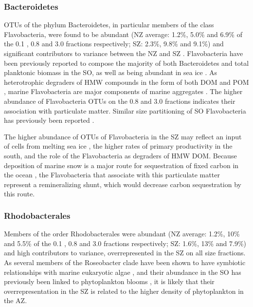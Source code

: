 \subsubsection{Bacteroidetes}

OTUs of the phylum Bacteroidetes, in particular members of the class Flavobacteria, were found to be abundant (\ac{NZ} average: 1.2\%, 5.0\% and 6.9\% of the 0.1 \micron{}, 0.8 \micron{} and 3.0 \micron{} fractions respectively; SZ: 2.3\%, 9.8\% and 9.1\%) and significant contributors to variance between the \ac{NZ} and \ac{SZ} .
Flavobacteria have been previously reported to compose the majority of both Bacteroidetes \cite{Murray:2007db} and total planktonic biomass \cite{Abell:2005ji} in the \ac{SO}, as well as being abundant in sea ice \cite{Brown:2001hh}.
As heterotrophic degraders of \ac{HMW} compounds in the form of both \ac{DOM} and \ac{POM} \cite{Kirchman:2002ub}, marine Flavobacteria are major components of marine aggregates \cite{Rath:1998wm,Crump:1999wo,Zhang:2007fb}.
The higher abundance of Flavobacteria \acp{OTU} on the 0.8 \micron{} and 3.0 \micron{} fractions indicates their association with particulate matter.
Similar size partitioning of \ac{SO} Flavobacteria has previously been reported \cite{Abell:2005ji}.

The higher abundance of \acp{OTU} of Flavobacteria in the \ac{SZ} may reflect an input of cells from melting sea ice \cite{Brown:2001hh}, the higher rates of primary productivity in the south, and the role of the Flavobacteria as degraders of \ac{HMW} \ac{DOM}.
Because deposition of marine snow is a major route for sequestration of fixed carbon in the ocean \citep[e.g.][]{Hessen:2004vq}, the Flavobacteria that associate with this particulate matter represent a remineralizing shunt, which would decrease carbon sequestration by this route.

\subsubsection{Rhodobacterales}

Members of the order Rhodobacterales were abundant (\ac{NZ} average: 1.2\%, 10\% and 5.5\% of the 0.1 \micron{}, 0.8 \micron{} and 3.0 \micron{} fractions respectively; \ac{SZ}: 1.6\%, 13\% and 7.9\%) and high contributors to variance, overrepresented in the \ac{SZ} on all size fractions.
As several members of the Roseobacter clade have been shown to have symbiotic relationships with marine eukaryotic algae \cite{Anonymous:2005hd,WagnerDobler:2006kb}, and their abundance in the \ac{SO} has previously been linked to phytoplankton blooms \cite{West:2008kc,Obernosterer:2011df}, it is likely that their overrepresentation in the \ac{SZ} is related to the higher density of phytoplankton in the \ac{AZ}.

